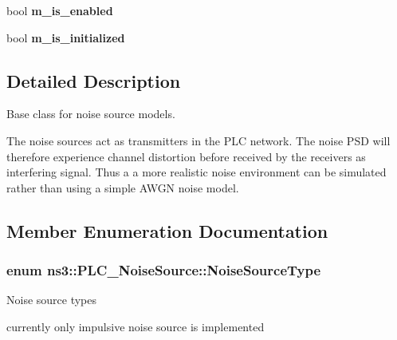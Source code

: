 \begin{DoxyCompactItemize}
\item 
\hypertarget{classns3_1_1PLC__NoiseSource_ae57359c93b18f7f6a9292f02f9a882ae}{bool {\bfseries m\-\_\-is\-\_\-enabled}}\label{classns3_1_1PLC__NoiseSource_ae57359c93b18f7f6a9292f02f9a882ae}

\item 
\hypertarget{classns3_1_1PLC__NoiseSource_a1bf1f07b508144cb85d5192ec864b498}{bool {\bfseries m\-\_\-is\-\_\-initialized}}\label{classns3_1_1PLC__NoiseSource_a1bf1f07b508144cb85d5192ec864b498}

\end{DoxyCompactItemize}


\subsection{\-Detailed \-Description}
\-Base class for noise source models. 

\-The noise sources act as transmitters in the \-P\-L\-C network. \-The noise \-P\-S\-D will therefore experience channel distortion before received by the receivers as interfering signal. \-Thus a a more realistic noise environment can be simulated rather than using a simple \-A\-W\-G\-N noise model. 

\subsection{\-Member \-Enumeration \-Documentation}
\hypertarget{classns3_1_1PLC__NoiseSource_a3f5751ed7e0ffe2f0c9ad37d2c75ff2b}{
\subsubsection[{\-Noise\-Source\-Type}]{\setlength{\rightskip}{0pt plus 5cm}enum {\bf ns3\-::\-P\-L\-C\-\_\-\-Noise\-Source\-::\-Noise\-Source\-Type}}}\label{classns3_1_1PLC__NoiseSource_a3f5751ed7e0ffe2f0c9ad37d2c75ff2b}
\-Noise source types

currently only impulsive noise source is implemented 

